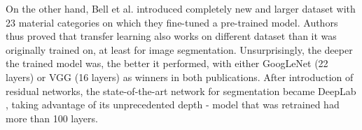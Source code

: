 On the other hand, Bell et al. \cite{material-recognition} introduced completely new and larger dataset with 23 material categories on which they fine-tuned a pre-trained model. Authors thus proved that transfer learning  also works on different dataset than it was originally trained on, at least for image segmentation.
\newline
Unsurprisingly, the deeper the trained model was, the better it performed, with either GoogLeNet (22 layers) or VGG (16 layers) as winners in both publications.
\newline
After introduction of residual networks, the state-of-the-art network for segmentation became DeepLab \cite{deeplab}, taking advantage of its unprecedented depth - model that was retrained had more than 100 layers.